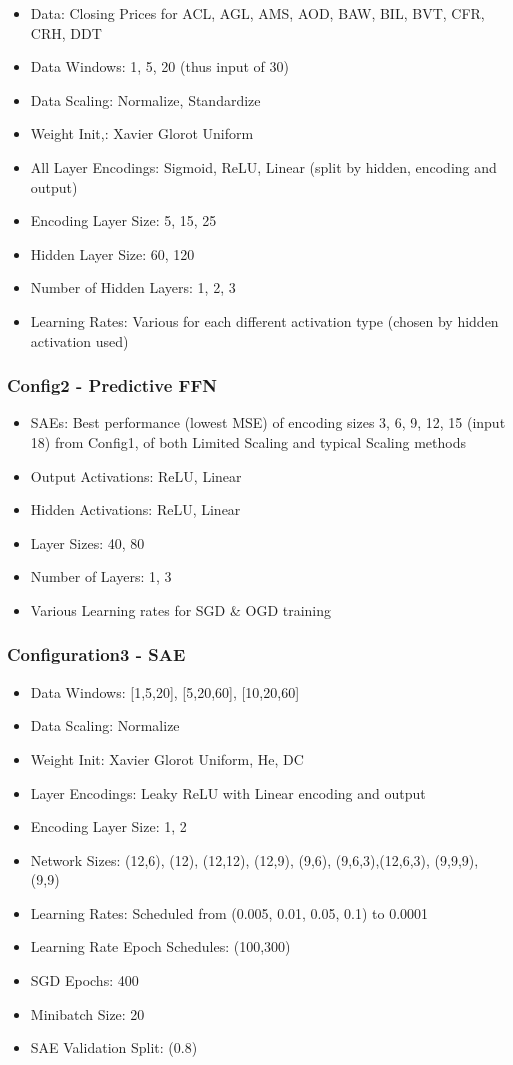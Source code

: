 \documentclass[a4paper,11pt,oneside]{article}
\theoremstyle{plain}
\theoremstyle{definition}
\begin{document}
\begin{itemize}
	\item Data: Closing Prices for ACL, AGL, AMS, AOD, BAW, BIL, BVT, CFR, CRH, DDT
	\item Data Windows: 1, 5, 20 (thus input of 30)
	\item Data Scaling: Normalize, Standardize
	\item Weight Init,: Xavier Glorot Uniform
	\item All Layer Encodings: Sigmoid, ReLU, Linear (split by hidden, encoding and output)
	\item Encoding Layer Size: 5, 15, 25
	\item Hidden Layer Size: 60, 120
	\item Number of Hidden Layers: 1, 2, 3
	\item Learning Rates: Various for each different activation type (chosen by hidden activation used)
\end{itemize}

\subsubsection{Config2 - Predictive FFN}\label{config2}

\begin{itemize}
	\item SAEs: Best performance (lowest MSE) of encoding sizes 3, 6, 9, 12, 15 (input 18) from Config1, of both Limited Scaling and typical Scaling methods
	\item Output Activations: ReLU, Linear
	\item Hidden Activations: ReLU, Linear
	\item Layer Sizes: 40, 80
	\item Number of Layers: 1, 3
	\item Various Learning rates for SGD \& OGD training
\end{itemize}

\subsubsection{Configuration3 - SAE}\label{config3}
\begin{itemize}
	\item Data Windows: [1,5,20], [5,20,60], [10,20,60]
	\item Data Scaling: Normalize
	\item Weight Init: Xavier Glorot Uniform, He, DC
	\item Layer Encodings: Leaky ReLU with Linear encoding and output
	\item Encoding Layer Size: 1, 2
	\item Network Sizes: (12,6), (12), (12,12), (12,9), (9,6), (9,6,3),(12,6,3), (9,9,9), (9,9)
	\item Learning Rates: Scheduled from (0.005, 0.01, 0.05, 0.1) to 0.0001
	\item Learning Rate Epoch Schedules: (100,300)
	\item SGD Epochs: 400
	\item Minibatch Size: 20
	\item SAE Validation Split: (0.8)
\end{itemize}
	
\end{document}
